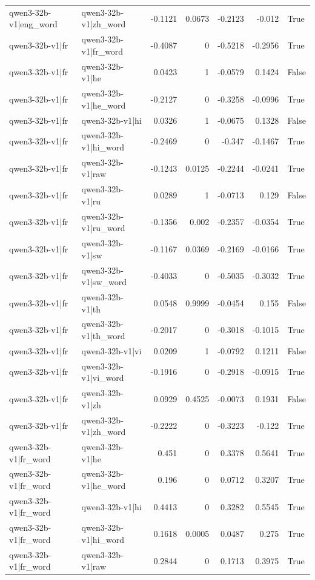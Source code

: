 \begin{table}
\begin{tabular}{l l r r r r l}
qwen3-32b-v1|eng_word & qwen3-32b-v1|zh_word & -0.1121 & 0.0673 & -0.2123 & -0.012 & True \\
qwen3-32b-v1|fr & qwen3-32b-v1|fr_word & -0.4087 & 0 & -0.5218 & -0.2956 & True \\
qwen3-32b-v1|fr & qwen3-32b-v1|he & 0.0423 & 1 & -0.0579 & 0.1424 & False \\
qwen3-32b-v1|fr & qwen3-32b-v1|he_word & -0.2127 & 0 & -0.3258 & -0.0996 & True \\
qwen3-32b-v1|fr & qwen3-32b-v1|hi & 0.0326 & 1 & -0.0675 & 0.1328 & False \\
qwen3-32b-v1|fr & qwen3-32b-v1|hi_word & -0.2469 & 0 & -0.347 & -0.1467 & True \\
qwen3-32b-v1|fr & qwen3-32b-v1|raw & -0.1243 & 0.0125 & -0.2244 & -0.0241 & True \\
qwen3-32b-v1|fr & qwen3-32b-v1|ru & 0.0289 & 1 & -0.0713 & 0.129 & False \\
qwen3-32b-v1|fr & qwen3-32b-v1|ru_word & -0.1356 & 0.002 & -0.2357 & -0.0354 & True \\
qwen3-32b-v1|fr & qwen3-32b-v1|sw & -0.1167 & 0.0369 & -0.2169 & -0.0166 & True \\
qwen3-32b-v1|fr & qwen3-32b-v1|sw_word & -0.4033 & 0 & -0.5035 & -0.3032 & True \\
qwen3-32b-v1|fr & qwen3-32b-v1|th & 0.0548 & 0.9999 & -0.0454 & 0.155 & False \\
qwen3-32b-v1|fr & qwen3-32b-v1|th_word & -0.2017 & 0 & -0.3018 & -0.1015 & True \\
qwen3-32b-v1|fr & qwen3-32b-v1|vi & 0.0209 & 1 & -0.0792 & 0.1211 & False \\
qwen3-32b-v1|fr & qwen3-32b-v1|vi_word & -0.1916 & 0 & -0.2918 & -0.0915 & True \\
qwen3-32b-v1|fr & qwen3-32b-v1|zh & 0.0929 & 0.4525 & -0.0073 & 0.1931 & False \\
qwen3-32b-v1|fr & qwen3-32b-v1|zh_word & -0.2222 & 0 & -0.3223 & -0.122 & True \\
qwen3-32b-v1|fr_word & qwen3-32b-v1|he & 0.451 & 0 & 0.3378 & 0.5641 & True \\
qwen3-32b-v1|fr_word & qwen3-32b-v1|he_word & 0.196 & 0 & 0.0712 & 0.3207 & True \\
qwen3-32b-v1|fr_word & qwen3-32b-v1|hi & 0.4413 & 0 & 0.3282 & 0.5545 & True \\
qwen3-32b-v1|fr_word & qwen3-32b-v1|hi_word & 0.1618 & 0.0005 & 0.0487 & 0.275 & True \\
qwen3-32b-v1|fr_word & qwen3-32b-v1|raw & 0.2844 & 0 & 0.1713 & 0.3975 & True \\

\end{tabular}
\end{table}
